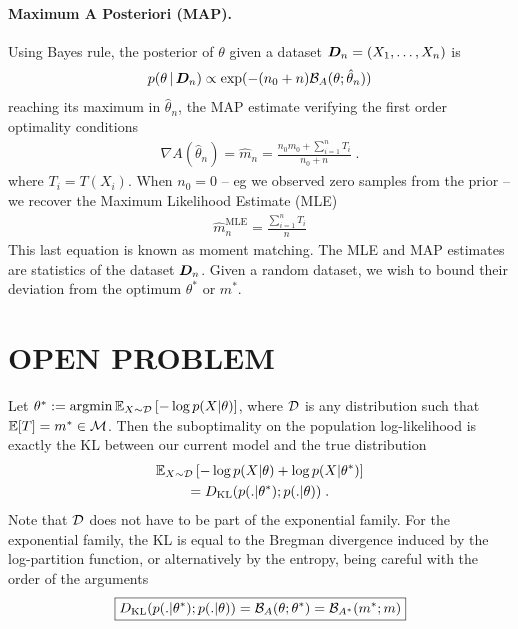 \documentclass[twoside]{article}
\let\oldsection\section
\renewcommand{\section}[1]{\oldsection{\texorpdfstring{\uppercase{#1}}{#1}}}
\newcommand*{\expect}[2][]{\ensuremath{\mathbb{E}_{#1} \left[ #2 \right] }} %
\newcommand{\cond}{\,\vert\,}
\newcommand{\logpart}{A}
\newcommand{\bregman}{\cB_\logpart}
\newcommand{\bregmanconj}{\cB_{\logpart^*}}
\newcommand{\nat}{\theta}
\newcommand{\m}{m}
\newcommand{\meanp}{\m}
\newcommand{\MAPm}{\hat \m_n}
\newcommand{\MAPt}{\hat \nat_n}
\begin{document}
\paragraph{Maximum A Posteriori (MAP).}
Using Bayes rule, the posterior of $\nat$ given a dataset ${\bm{D}}_n =(X_1,\dots,X_n)$ is
\begin{align}
	p(\nat \cond \mD_n)
    \propto \exp(- (n_0+n) \bregman(\nat; \MAPt))
    \label{eq:joint_likelihood}
\end{align}
reaching its maximum in $\MAPt$, the MAP estimate verifying the first order optimality conditions
\begin{align}
    \nabla \logpart(\MAPt) = \MAPm
    = \frac{n_0 \meanp_0 + \sum_{i=1}^n T_i}{n_0+n} \; .
\end{align}
where $T_i=T(X_i)$.
When $n_0=0$ -- eg we observed zero samples from the prior -- we recover the Maximum Likelihood Estimate (MLE)
\begin{align}
	\hat \m_n^\text{MLE} = \frac{\sum_{i=1}^n T_i}{n}
\end{align}
This last equation is known as moment matching.
The MLE and MAP estimates are statistics of the dataset ${\bm{D}}_n$. 
Given a random dataset, we wish to bound their deviation from the optimum $\nat^*$ or $\meanp^*$.


\section{Open Problem}

Let $\nat^* := \argmin \expect[X\sim\cD]{-\log p(X|\nat)}$, where ${\mathcal D}$ is any distribution such that $\E[T] = \meanp^* \in \cM$.
Then the suboptimality on the population log-likelihood is exactly the KL between our current model and the true distribution
\begin{multline}
    \expect[X\sim \cD]{-\log p(X|\nat) + \log p(X|\nat^*) } \\
	= \KL( p(.|\nat^*) ; p(.|\nat)) \; .
\end{multline}
Note that ${\mathcal D}$ does not have to be part of the exponential family.
For the exponential family, the KL is equal to the Bregman divergence induced by the log-partition function, or alternatively by the entropy, being careful with the order of the arguments 
\begin{align}
\boxed{
	\KL( p(.|\nat^*) ; p(.|\nat))
    = \bregman (\nat ; \nat^*)
    = \bregmanconj ( \meanp^* ; \meanp)
}
\end{align}
\end{document}
